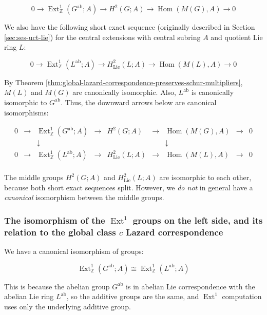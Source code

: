 \documentclass{ucetd}
\begin{document}
\begin{equation*}
  0 \to \operatorname{Ext}^1_{\mathbb{Z}}(G^{\operatorname{ab}};A) \to H^2(G;A) \to \operatorname{Hom}(M(G),A) \to 0
\end{equation*}

We also have the following short exact sequence (originally described
in Section \ref{sec:ses-uct-lie}) for the central extensions with
central subring $A$ and quotient Lie ring $L$:

\begin{equation*}
0 \to \operatorname{Ext}^1_{\mathbb{Z}}(L^{\operatorname{ab}};A) \to H^2_{\text{Lie}}(L;A) \to \operatorname{Hom}(M(L), A) \to 0
\end{equation*}

By Theorem
\ref{thm:global-lazard-correspondence-preserves-schur-multipliers},
$M(L)$ and $M(G)$ are canonically isomorphic. Also,
$L^{\operatorname{ab}}$ is canonically isomorphic to
$G^{\operatorname{ab}}$. Thus, the downward arrows below are canonical
isomorphisms:

$$\begin{array}{ccccccccc}
  0 &\to &\operatorname{Ext}^1_{\mathbb{Z}}(G^{\operatorname{ab}};A) &\to &H^2(G;A) &\to &\operatorname{Hom}(M(G),A) &\to &0\\
  & & \downarrow & & & & \downarrow & & \\
  0 &\to &\operatorname{Ext}^1_{\mathbb{Z}}(L^{\operatorname{ab}};A) & \to & H^2_{\text{Lie}}(L;A) & \to & \operatorname{Hom}(M(L), A) & \to & 0\\
\end{array}$$
  
The middle groups $H^2(G;A)$ and $H^2_{\text{Lie}}(L;A)$ are isomorphic
to each other, because both short exact sequences split. However, we
{\em do not} in general have a {\em canonical} isomorphism between the
middle groups.

\subsubsection{The isomorphism of the $\operatorname{Ext}^1$ groups on the left side, and its relation to the global class $c$ Lazard correspondence}

We have a canonical isomorphism of groups:

$$\operatorname{Ext}^1_{\mathbb{Z}}(G^{\operatorname{ab}};A) \cong \operatorname{Ext}^1_{\mathbb{Z}}(L^{\operatorname{ab}};A)$$

This is because the abelian group $G^{\operatorname{ab}}$ is in
abelian Lie correspondence with the abelian Lie ring
$L^{\operatorname{ab}}$, so the additive groups are the same, and
$\operatorname{Ext}^1$ computation uses only the underlying additive
group.
\end{document}

